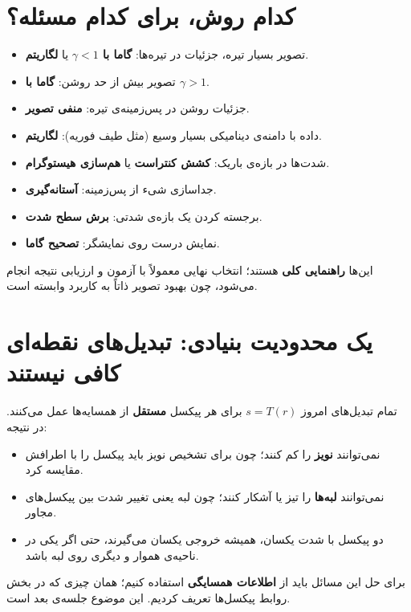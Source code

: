 \documentclass[11pt,a4paper]{article}
\begin{document}
	
	\section{کدام روش، برای کدام مسئله؟}
	
	\begin{itemize}
		\item تصویر بسیار تیره، جزئیات در تیره‌ها: \textbf{گاما با $\gamma<1$} یا \textbf{لگاریتم}.
		\item تصویر بیش از حد روشن: \textbf{گاما با $\gamma>1$}.
		\item جزئیات روشن در پس‌زمینه‌ی تیره: \textbf{منفی تصویر}.
		\item داده با دامنه‌ی دینامیکی بسیار وسیع (مثل طیف فوریه): \textbf{لگاریتم}.
		\item شدت‌ها در بازه‌ی باریک: \textbf{کشش کنتراست} یا \textbf{هم‌سازی هیستوگرام}.
		\item جداسازی شیء از پس‌زمینه: \textbf{آستانه‌گیری}.
		\item برجسته کردن یک بازه‌ی شدتی: \textbf{برش سطح شدت}.
		\item نمایش درست روی نمایشگر: \textbf{تصحیح گاما}.
	\end{itemize}
	
	این‌ها \textbf{راهنمایی کلی} هستند؛ انتخاب نهایی معمولاً با آزمون و ارزیابی نتیجه انجام می‌شود،
	چون بهبود تصویر ذاتاً به کاربرد وابسته است.
	
	
	\section{یک محدودیت بنیادی: تبدیل‌های نقطه‌ای کافی نیستند}
	
	تمام تبدیل‌های امروز $s=T(r)$ برای هر پیکسل \textbf{مستقل} از همسایه‌ها عمل می‌کنند.
	در نتیجه:
	
	\begin{itemize}
		\item نمی‌توانند \textbf{نویز} را کم کنند؛ چون برای تشخیص نویز باید پیکسل را با اطرافش مقایسه کرد.
		\item نمی‌توانند \textbf{لبه‌ها} را تیز یا آشکار کنند؛ چون لبه یعنی تغییر شدت بین پیکسل‌های مجاور.
		\item دو پیکسل با شدت یکسان، همیشه خروجی یکسان می‌گیرند، حتی اگر یکی در ناحیه‌ی هموار و دیگری روی لبه باشد.
	\end{itemize}
	
	برای حل این مسائل باید از \textbf{اطلاعات همسایگی} استفاده کنیم؛ همان چیزی که در
	بخش روابط پیکسل‌ها تعریف کردیم. این موضوع جلسه‌ی بعد است.
	
\end{document}
